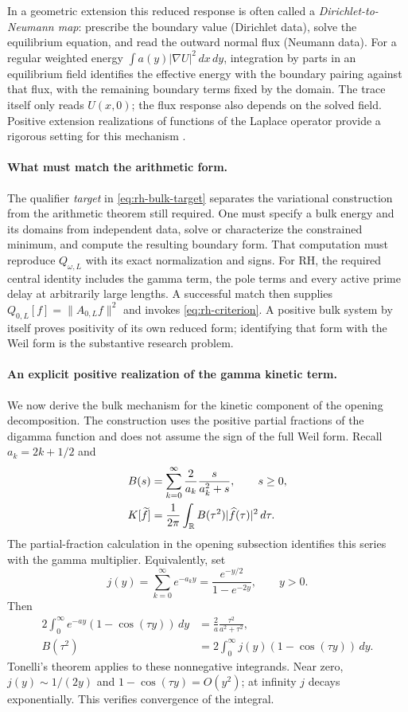 In a geometric extension this reduced response is often called a
\emph{Dirichlet-to-Neumann map}: prescribe the boundary value
(Dirichlet data), solve the equilibrium equation, and read the
outward normal flux (Neumann data). For a regular weighted energy
$\int a(y)|\nabla U|^2\,dx\,dy$, integration by parts in an
equilibrium field identifies the effective energy with the
boundary pairing against that flux, with the remaining boundary
terms fixed by the domain. The trace itself only reads $U(x,0)$;
the flux response also depends on the solved field.
Positive extension realizations of functions of the Laplace
operator provide a rigorous setting for this mechanism
\cite{KwasnickiMuchaBackground}.

\paragraph{What must match the arithmetic form.}
The qualifier \emph{target} in \eqref{eq:rh-bulk-target} separates
the variational construction from the arithmetic theorem still
required. One must specify a bulk energy and its domains from
independent data, solve or characterize the constrained minimum,
and compute the resulting boundary form. That computation must
reproduce $Q_{\omega,L}$ with its exact normalization and signs.
For RH, the required central identity includes the gamma term,
the pole terms and every active prime delay at arbitrarily large
lengths. A successful match then supplies
$Q_{0,L}[f]=\lVert A_{0,L}f\rVert^2$ and invokes
\eqref{eq:rh-criterion}. A positive bulk system by itself proves
positivity of its own reduced form; identifying that form with the
Weil form is the substantive research problem.

\paragraph{An explicit positive realization of the gamma kinetic term.}
We now derive the bulk mechanism for the kinetic component of the
opening decomposition. The construction uses the positive partial
fractions of the digamma function and does not assume the sign of
the full Weil form. Recall $a_k=2k+1/2$ and
\begin{align}
B(s)&=\sum_{k=0}^{\infty}\frac2{a_k}\frac{s}{a_k^2+s},
\qquad s\geq0,\notag\\
K[\widetilde f]&=
\frac1{2\pi}\int_{\mathbb R}B(\tau^2)|\widehat f(\tau)|^2\,d\tau .
\label{eq:rh-kinetic}
\end{align}
The partial-fraction calculation in the opening subsection identifies
this series with the gamma multiplier. Equivalently, set
\[
j(y)=\sum_{k=0}^\infty e^{-a_ky}
=\frac{e^{-y/2}}{1-e^{-2y}},\qquad y>0.
\]
Then
\[
\begin{aligned}
2\int_0^\infty e^{-ay}(1-\cos(\tau y))\,dy
&=\frac2a\frac{\tau^2}{a^2+\tau^2},\\
B(\tau^2)&=2\int_0^\infty j(y)(1-\cos(\tau y))\,dy.
\end{aligned}
\]
Tonelli's theorem applies to these nonnegative integrands. Near zero,
$j(y)\sim1/(2y)$ and $1-\cos(\tau y)=O(y^2)$; at infinity $j$
decays exponentially. This verifies convergence of the integral.

